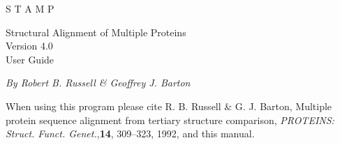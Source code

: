 
\newcommand{\al}{\mbox{$\alpha$~}}  
\newcommand{\be}{\mbox{$\beta$~}}  
\newcommand{\albe}{\mbox{$\alpha/\beta$~}}
  
\newcommand{\tten}{\mbox{${\rm 3_{10}}$~}}  
\newcommand{\ea}{\mbox{\em et al. \/}}  
\newcommand{\Cal}{\mbox{${\rm C}_{\alpha}$~}}  
\newcommand{\Cbe}{\mbox{${\rm C}_{\beta}$~}}
\newcommand{\ii}{\mbox{$i$~}}
\newcommand{\jj}{\mbox{$j$~}}
\newcommand{\ip}{\mbox{$i^{\prime}$~}}
\newcommand{\jp}{\mbox{$j^{\prime}$~}}
\newcommand{\sdp}{\setlength{\baselineskip}{18truept}}
\newcommand{\ssp}{\setlength{\baselineskip}{13.6truept}}
  



\begin{titlepage}
\begin{center}
\begin{bf}
\begin{Huge}
S T A M P\\
\end{Huge}
\begin{Large}
Structural Alignment of Multiple Proteins \\
Version 4.0\\
User Guide\\
\end{Large}
\end{bf}
\vskip 0.25in

{\em By Robert B. Russell \& Geoffrey J. Barton}\\
\end{center}
\vskip 0.25in

\noindent
When using this program please cite R. B. Russell \& G. J.  Barton, 
Multiple protein sequence alignment from tertiary structure 
comparison, {\em PROTEINS: Struct. Funct. Genet.},{\bf 14}, 
309--323, 1992, and this manual.\\

\vskip 0.25in


\end{titlepage}
